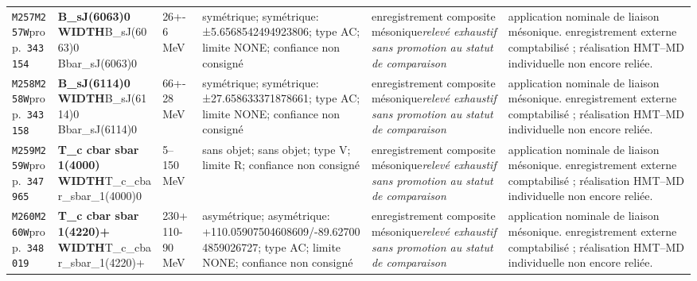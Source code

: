 \begin{landscape}
\begin{longtable}{L{1.85cm}L{4.45cm}L{2.35cm}L{4.05cm}L{3.35cm}L{7.15cm}}
\texttt{M257}\newline \texttt{M257W}\newline prop.\ \texttt{343154} & \textbf{B\_\allowbreak{}sJ(6063)0 WIDTH}\newline B\_\allowbreak{}sJ(6063)0 \textbar{}\allowbreak{} Bbar\_\allowbreak{}sJ(6063)0 & 26+-6\,MeV & symétrique; symétrique: ±5.6568542494923806; type AC; limite NONE; confiance non consigné & enregistrement composite mésonique\newline \emph{relevé exhaustif sans promotion au statut de comparaison} & application nominale de liaison mésonique. enregistrement externe comptabilisé ; réalisation HMT--MD individuelle non encore reliée. \\
\texttt{M258}\newline \texttt{M258W}\newline prop.\ \texttt{343158} & \textbf{B\_\allowbreak{}sJ(6114)0 WIDTH}\newline B\_\allowbreak{}sJ(6114)0 \textbar{}\allowbreak{} Bbar\_\allowbreak{}sJ(6114)0 & 66+-28\,MeV & symétrique; symétrique: ±27.658633371878661; type AC; limite NONE; confiance non consigné & enregistrement composite mésonique\newline \emph{relevé exhaustif sans promotion au statut de comparaison} & application nominale de liaison mésonique. enregistrement externe comptabilisé ; réalisation HMT--MD individuelle non encore reliée. \\
\texttt{M259}\newline \texttt{M259W}\newline prop.\ \texttt{347965} & \textbf{T\_\allowbreak{}c cbar sbar 1(4000) WIDTH}\newline T\_\allowbreak{}c\_\allowbreak{}cbar\_\allowbreak{}sbar\_\allowbreak{}1(4000)0 & 5--150\,MeV & sans objet; sans objet; type V; limite R; confiance non consigné & enregistrement composite mésonique\newline \emph{relevé exhaustif sans promotion au statut de comparaison} & application nominale de liaison mésonique. enregistrement externe comptabilisé ; réalisation HMT--MD individuelle non encore reliée. \\
\texttt{M260}\newline \texttt{M260W}\newline prop.\ \texttt{348019} & \textbf{T\_\allowbreak{}c cbar sbar 1(4220)+ WIDTH}\newline T\_\allowbreak{}c\_\allowbreak{}cbar\_\allowbreak{}sbar\_\allowbreak{}1(4220)+ & 230+110-90\,MeV & asymétrique; asymétrique: +110.05907504608609/-89.627004859026727; type AC; limite NONE; confiance non consigné & enregistrement composite mésonique\newline \emph{relevé exhaustif sans promotion au statut de comparaison} & application nominale de liaison mésonique. enregistrement externe comptabilisé ; réalisation HMT--MD individuelle non encore reliée. \\

\end{longtable}
\end{landscape}
